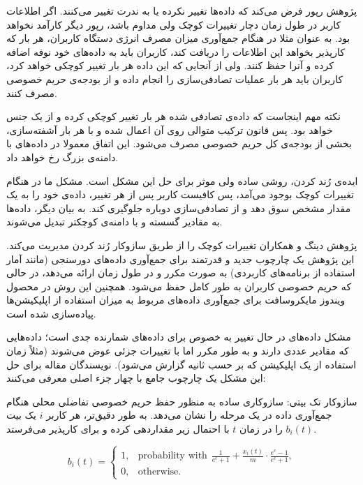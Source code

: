 
پژوهش رپور فرض می‌کند که داده‌ها تغییر نکرده یا به ندرت تغییر می‌کنند. اگر اطلاعات کاربر در طول زمان دچار تغییرات کوچک ولی مداوم باشد، رپور دیگر کارآمد نخواهد بود. به عنوان مثلا در هنگام جمع‌آوری میزان مصرف انرژی دستگاه کاربران، هر بار که کارپذیر بخواهد این اطلاعات را دریافت کند، کاربران باید به داده‌های خود نوفه اضافه کرده و آنرا حفظ کنند. ولی از آنجایی که این داده هر بار تغییر کوچکی خواهد کرد، کاربران باید هر بار عملیات تصادفی‌سازی را انجام داده و از بودجه‌ی حریم خصوصی مصرف کنند. 

نکته مهم اینجاست که داده‌‌ی تصادفی شده هر بار تغییر کوچکی کرده و از یک جنس خواهد بود. پس قانون ترکیب متوالی روی آن اعمال شده و با هر بار آشفته‌سازی، بخشی از بودجه‌ی کل حریم خصوصی مصرف می‌شود. این اتفاق معمولا در داده‌های با دامنه‌ی بزرگ رخ خواهد داد.

ایده‌ی رُند کردن، روشی ساده ولی موثر برای حل این مشکل است. مشکل ما در هنگام تغییرات کوچک بوجود می‌آمد، پس کافیست کاربر پس از هر تغییر، داده‌ی خود را به یک مقدار مشخص سوق دهد و از تصادفی‌سازی دوباره جلوگیری کند. به بیان دیگر، داده‌ها به مقادیر گسسته و با دامنه‌ی کوچکتر تبدیل می‌شوند.


پژوهش دینگ و همکاران  تغییرات کوچک را از طریق سازوکار رُند کردن مدیریت می‌کند. این پژوهش یک چارچوب جدید و قدرتمند برای جمع‌آوری داده‌های دورسنجی (مانند آمار استفاده از برنامه‌های کاربردی) به صورت مکرر و در طول زمان ارائه می‌دهد، در حالی که حریم خصوصی کاربران به طور کامل حفظ می‌شود. همچنین این روش در محصول ویندوز مایکروسافت برای جمع‌آوری داده‌های مربوط به میزان استفاده از اپلیکیشن‌ها پیاده‌سازی شده است.


مشکل داده‌های در حال تغییر به خصوص برای داده‌های شمارنده جدی است؛ داده‌هایی که مقادیر عددی دارند و به طور مکرر اما با تغییرات جزئی عوض می‌شوند (مثلاً زمان استفاده از یک اپلیکیشن که بر حسب ثانیه گزارش می‌شود). نویسندگان مقاله برای حل این مشکل یک چارچوب جامع با چهار جزء اصلی معرفی می‌کنند:


 سازوکار تک بیتی: سازوکاری ساده به منظور حفظ حریم خصوصی تفاضلی محلی هنگام جمع‌آوری داده در یک مرحله را نشان می‌دهد. به طور دقیق‌تر، هر کاربر $i$ یک بیت $b_i(t)$ را در زمان $t$ با احتمال زیر مقداردهی کرده و برای کارپذیر می‌فرستد.

$$b_i(t) = 
\begin{cases} 
1, & \text{probability with} \hspace{5pt} \frac{1}{e^\epsilon+1} + \frac{x_i(t)}{m} \cdot \frac{e^\epsilon-1}{e^\epsilon+1}, \\
0, & \text{otherwise.} 
\end{cases}$$

